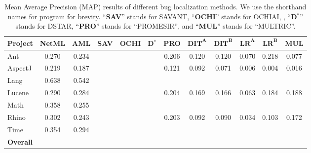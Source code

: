 \begin{table*}[!t]
	\centering
	\caption{Mean Average Precision (MAP) results of different bug localization methods. We use the shorthand names for program for brevity. ``\textbf{SAV}'' stands for SAVANT, ``\textbf{OCHI}'' stands for OCHIAI, , ``\textbf{D$^{*}$}'' stands for DSTAR, ``\textbf{PRO}'' stands for ``PROMESIR'', and ``\textbf{MUL}'' stands for ``MULTRIC''.}
	\begin{tabular}{|l|c|c|c|c|c|c|c|c|c|c|c|}
		\hline
		\textbf{Project} & \textbf{NetML} & \textbf{AML} & \textbf{SAV} & \textbf{OCHI} & \textbf{D}$^{*}$ & \textbf{PRO} & $\textbf{DIT}^\textbf{A}$ & $\textbf{DIT}^\textbf{B}$ & $\textbf{LR}^\textbf{A}$ & $\textbf{LR}^\textbf{B}$ & \textbf{MUL}\\
		\hline\hline
		Ant &0.270&0.234&&&&0.206&0.120&0.120&0.070&0.218&0.077\\
		AspectJ &0.219&0.187&&&&0.121&0.092&0.071&0.006&0.004&0.016\\
		Lang&0.638&0.542&&&&&&&&&\\
		Lucene &0.290&0.284&&&&0.204&0.169&0.166&0.063&0.184&0.188\\
		Math&0.358&0.255&&&&&&&&&\\
		Rhino &0.302&0.243&&&&0.203&0.092&0.090&0.034&0.103&0.172\\
		Time&0.354&0.294&&&&&&&&&\\
		\hline
		\textbf{Overall} &&&&&&&&&&&\\
		
		\hline
	\end{tabular}
	\label{tab:result_map}
\end{table*}

